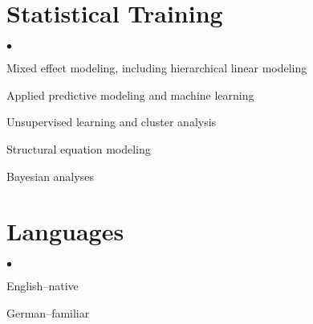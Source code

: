 \documentclass[margin,line]{res}
\newenvironment{list2}{
  \begin{list}{$\bullet$}{%
      \setlength{\itemsep}{0in}
      \setlength{\parsep}{0in} \setlength{\parskip}{0in}
      \setlength{\topsep}{0in} \setlength{\partopsep}{0in} 
      \setlength{\leftmargin}{0.2in}}}{\end{list}}
\begin{document}
\begin{resume}
\section{\sc Statistical Training}
\begin{list2}
\item Mixed effect modeling, including hierarchical linear modeling
\item Applied predictive modeling and machine learning
\item Unsupervised learning and cluster analysis
\item Structural equation modeling
\item Bayesian analyses
\end{list2}

\vspace{-2mm}
\section{\sc Languages}

\begin{list2}
\item English--native
\item German--familiar
\end{list2}


\end{resume}
\end{document}
